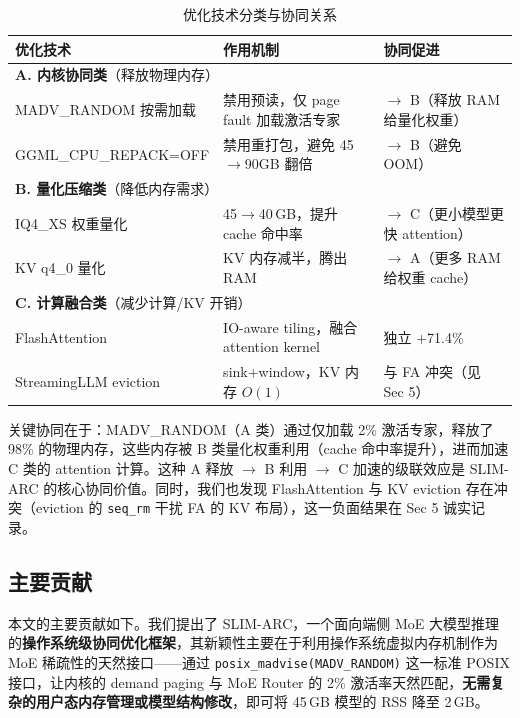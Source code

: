\begin{table}[H]
    \centering
    \caption{优化技术分类与协同关系}
    \label{tab:optimization_synergy}
    \begin{tabular}{p{}p{}p{}}
        \toprule
        \textbf{优化技术} & \textbf{作用机制} & \textbf{协同促进} \\
        \midrule
        \multicolumn{3}{l}{\textbf{A. 内核协同类}（释放物理内存）} \\
        \midrule
        MADV\_RANDOM 按需加载 & 禁用预读，仅 page fault 加载激活专家 & $\to$ B（释放 RAM 给量化权重） \\
        GGML\_CPU\_REPACK=OFF & 禁用重打包，避免 45$\to$90GB 翻倍 & $\to$ B（避免 OOM） \\
        \midrule
        \multicolumn{3}{l}{\textbf{B. 量化压缩类}（降低内存需求）} \\
        \midrule
        IQ4\_XS 权重量化 & 45$\to$40\,GB，提升 cache 命中率 & $\to$ C（更小模型更快 attention） \\
        KV q4\_0 量化 & KV 内存减半，腾出 RAM & $\to$ A（更多 RAM 给权重 cache） \\
        \midrule
        \multicolumn{3}{l}{\textbf{C. 计算融合类}（减少计算/KV 开销）} \\
        \midrule
        FlashAttention & IO-aware tiling，融合 attention kernel & 独立 +71.4\% \\
        StreamingLLM eviction & sink+window，KV 内存 $O(1)$ & 与 FA 冲突（见 Sec 5） \\
        \bottomrule
    \end{tabular}
\end{table}

关键协同在于：MADV\_RANDOM（A 类）通过仅加载 2\% 激活专家，释放了 98\% 的物理内存，这些内存被 B 类量化权重利用（cache 命中率提升），进而加速 C 类的 attention 计算。这种 A 释放 $\to$ B 利用 $\to$ C 加速的级联效应是 SLIM-ARC 的核心协同价值。同时，我们也发现 FlashAttention 与 KV eviction 存在冲突（eviction 的 \texttt{seq\_rm} 干扰 FA 的 KV 布局），这一负面结果在 Sec 5 诚实记录。

\subsection{主要贡献}

本文的主要贡献如下。我们提出了 SLIM-ARC，一个面向端侧 MoE 大模型推理的\textbf{操作系统级协同优化框架}，其新颖性主要在于利用操作系统虚拟内存机制作为 MoE 稀疏性的天然接口——通过 \texttt{posix\_madvise(MADV\_RANDOM)} 这一标准 POSIX 接口，让内核的 demand paging 与 MoE Router 的 2\% 激活率天然匹配，\textbf{无需复杂的用户态内存管理或模型结构修改}，即可将 45\,GB 模型的 RSS 降至 2\,GB。

